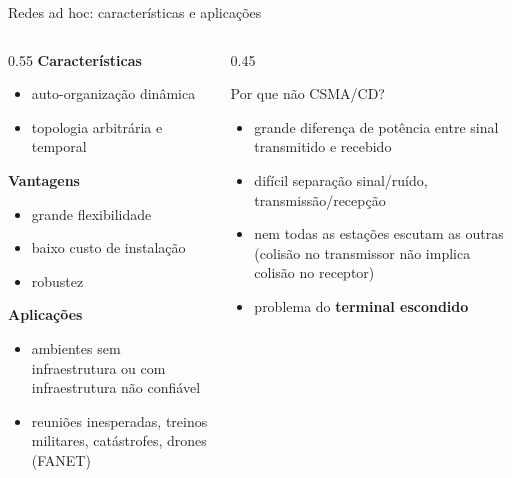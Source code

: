 \documentclass[aspectratio=169,11pt]{beamer}
\begin{document}
\begin{frame}{Redes ad hoc: características e aplicações}
  \begin{columns}
    \begin{column}{0.55\textwidth}
      \textbf{Características}
      \begin{itemize}
        \item auto-organização dinâmica
        \item topologia arbitrária e temporal
      \end{itemize}
      \textbf{Vantagens}
      \begin{itemize}
        \item grande flexibilidade
        \item baixo custo de instalação
        \item robustez
      \end{itemize}
      \textbf{Aplicações}
      \begin{itemize}
        \item ambientes sem infraestrutura ou com infraestrutura não confiável
        \item reuniões inesperadas, treinos militares, catástrofes, drones (FANET)
      \end{itemize}
    \end{column}
    \begin{column}{0.45\textwidth}
      \begin{block}{Por que não CSMA/CD?}
        \begin{itemize}
          \item grande diferença de potência entre sinal transmitido e recebido
          \item difícil separação sinal/ruído, transmissão/recepção
          \item nem todas as estações escutam as outras (colisão no transmissor não implica colisão no receptor)
          \item problema do \textbf{terminal escondido}
        \end{itemize}
      \end{block}
    \end{column}
  \end{columns}
\end{frame}
\end{document}
